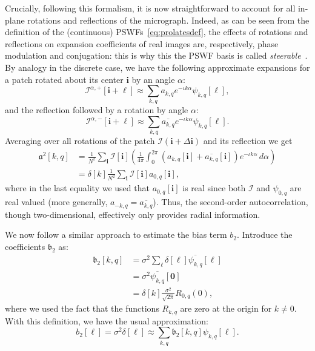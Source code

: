 \documentclass[english,11pt]{article}
\newcommand{\1}{\mathbf{1}}
\newcommand{\II}{\mathcal{I}}
\newcommand{\mb}{\mathbf}
\newcommand*\Bell{\ensuremath{\boldsymbol\ell}}
\numberwithin{equation}{section}
\theoremstyle{plain}
\theoremstyle{definition}
\theoremstyle{remark}
\theoremstyle{plain}
\theoremstyle{remark}
\theoremstyle{plain}
\theoremstyle{plain}
\begin{document}
Crucially, following this formalism, it is now straightforward to account for all in-plane rotations and reflections of the micrograph. Indeed, as can be seen from the definition of the (continuous) PSWFs~\eqref{eq:prolatesdef}, the effects of rotations and reflections on expansion coefficients of real images are, respectively, phase modulation and conjugation: this is why this the PSWF basis is called \emph{steerable}~\cite{landa2017steerable,zhao2016fast}. By analogy in the discrete case, we have the following approximate expansions for a patch rotated about its center $\mb i$ by an angle $\alpha$:
\[ \II^{\alpha,+}[\mb i+\Bell] \approx \sum_{k,q}a_{k,q}e^{-\iota k\alpha}\psi_{k,q}[\Bell],\]
and the reflection followed by a rotation by angle $\alpha$:
\[ \II^{\alpha,-}[\mb i+\Bell] \approx \sum_{k,q}\overline{a_{k,q}}e^{-\iota k\alpha}\psi_{k,q}[\Bell].\]
Averaging over all rotations of the patch $\II(\mb i + \Delta\mb i)$ and its reflection we get
\begin{align} \label{eq:second_order_ac_pswf}
\mathfrak{a}^2[k,q] &= \frac{1}{N^2}\sum_{\mb i}\II[\mb i]\left(\frac{1}{4\pi}\int_0^{2\pi}\left(a_{k,q}[\mb i] +
\overline{a_{k,q}}[\mb i]\right)e^{-\iota k\alpha}\, d\alpha\right)\nonumber\\ 
&= \delta[k] \frac{1}{N^2}\sum_{\mb i}\II[\mb i]a_{0,q}[\mb i], 
\end{align}
where in the last equality we used that $a_{0,q}[\mb i]$ is real since both $\II$ and $\psi_{0,q}$ are real valued (more generally, $a_{-k,q}=\overline{a_{k,q}}$).
Thus, the second-order autocorrelation, though two-dimensional, effectively only provides radial information.

We now follow a similar approach to estimate the bias term $b_2$.
Introduce the coefficients $\mathfrak{b}_2$ as:
\[\begin{aligned} 
\mathfrak{b}_2[k,q] & = \sigma^2\sum_{\Bell}\delta[\Bell]\overline{\psi_{k,q}}[\Bell]\\
&= \sigma^2\overline{\psi_{k,q}}[\mb 0]\\
&= \delta[k] \frac{\sigma^2}{\sqrt{2\pi}}R_{0,q}(0), \end{aligned}\]
where we used the fact that the functions $R_{k,q}$ are zero at the origin for $k\neq 0$.
With this definition, we have the usual approximation:
\[ b_2[\Bell] = \sigma^2\delta[\Bell] \approx \sum_{k,q}\mathfrak{b}_2[k,q]\psi_{k,q}[\Bell].\]
\end{document}
